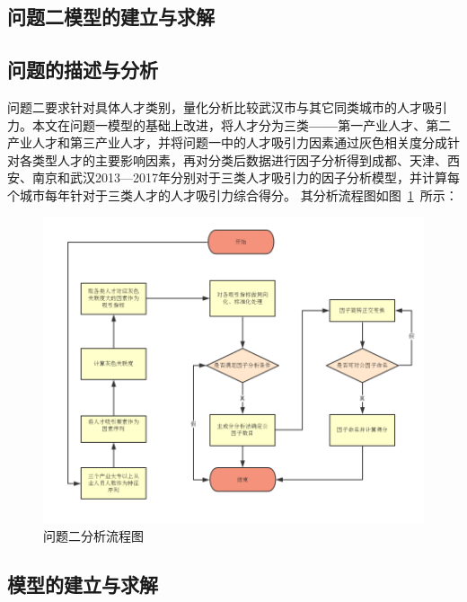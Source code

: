 \documentclass{whutmod}
\begin{document}
\begin{itemize}
	
	
	\section{问题二模型的建立与求解}
	\subsection{问题的描述与分析}
	问题二要求针对具体人才类别，量化分析比较武汉市与其它同类城市的人才吸引力。本文在问题一模型的基础上改进，将人才分为三类\textbf{——}第一产业人才、第二产业人才和第三产业人才，并将问题一中的人才吸引力因素通过灰色相关度分成针对各类型人才的主要影响因素，再对分类后数据进行因子分析得到成都、天津、西安、南京和武汉2013—2017年分别对于三类人才吸引力的因子分析模型，并计算每个城市每年针对于三类人才的人才吸引力综合得分。 其分析流程图如图~\ref{2222}~所示：
	
	\begin{figure}[H]
	\centering
	\includegraphics[width=\textwidth]{figures/2222.png}
	\caption{问题二分析流程图}\label{2222}
	\end{figure}



	\subsection{模型的建立与求解}


\end{itemize}
\end{document}
